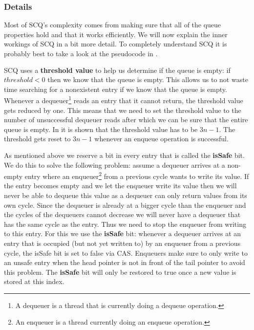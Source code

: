 \documentclass{article}      %
\begin{document}
\subsubsection{Details}
Most of SCQ's complexity comes from making sure that all of the queue properties hold and that it works efficiently. We will now explain the inner workings of SCQ in a bit more detail. To completely understand SCQ it is probably best to take a look at the pseudocode in \cite{nikolaev2019scalable}.

SCQ uses a \textbf{threshold value} to help us determine if the queue is empty: if $threshold < 0$ then we know that the queue is empty. This allows us to not waste time searching for a nonexistent entry if we know that the queue is empty. Whenever a dequeuer\footnote{A dequeuer is a thread that is currently doing a dequeue operation.} reads an entry that it cannot return, the threshold value gets reduced by one. This means that we need to set the threshold value to the number of unsuccessful dequeuer reads after which we can be sure that the entire queue is empty. In \cite{nikolaev2019scalable} it is shown that the threshold value has to be $3n-1$. The threshold gets reset to $3n-1$ whenever an enqueue operation is successful.

As mentioned above we reserve a bit in every entry that is called the \textbf{isSafe} bit. We do this to solve the following problem: assume a dequeuer arrives at a non-empty entry where an enqueuer\footnote{An enqueuer is a thread currently doing an enqueue operation.} from a previous cycle wants to write its value. If the entry becomes empty and we let the enqueuer write its value then we will never be able to dequeue this value as a dequeuer can only return values from its own cycle. Since the dequeuer is already at a bigger cycle than the enqueuer and the cycles of the dequeuers cannot decrease we will never have a dequeuer that has the same cycle as the entry. Thus we need to stop the enqueuer from writing to this entry. For this we use the \textbf{isSafe} bit:
whenever a dequeuer arrives at an entry that is occupied (but not yet written to) by an enqueuer from a previous cycle, the isSafe bit is set to false via CAS. Enqueuers make sure to only write to an unsafe entry when the head pointer is not in front of the tail pointer to avoid this problem. The \textbf{isSafe} bit will only be restored to true once a new value is stored at this index.
\end{document}
